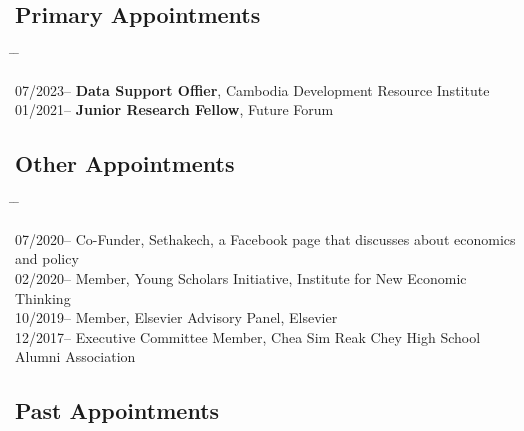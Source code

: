 \documentclass[10pt,a4paper]{article}
\newcommand{\tabbedblock}[1]{

	\begin{tabbing}
		\hspace{3cm} \= \hspace{4cm} \= \kill
		#1
	\end{tabbing}
}
\begin{document}

\subsection*{Primary Appointments}	

\tabbedblock{
		07/2023--  \> \textbf{Data Support Offier}, Cambodia Development Resource Institute \\
	
		01/2021--  \> \textbf{Junior Research Fellow}, Future Forum \\
}
	
\vspace{-2em}	
\subsection*{Other Appointments}

\tabbedblock{


	07/2020-- \> Co-Funder, Sethakech, a Facebook page that discusses about economics and policy\\

	02/2020-- \> Member, Young Scholars Initiative, Institute for New Economic Thinking\\

	10/2019-- \> Member, Elsevier Advisory Panel, Elsevier\\


	12/2017-- \> Executive Committee Member, Chea Sim Reak Chey High School Alumni Association
}
	
\subsection*{Past Appointments}
\end{document}
